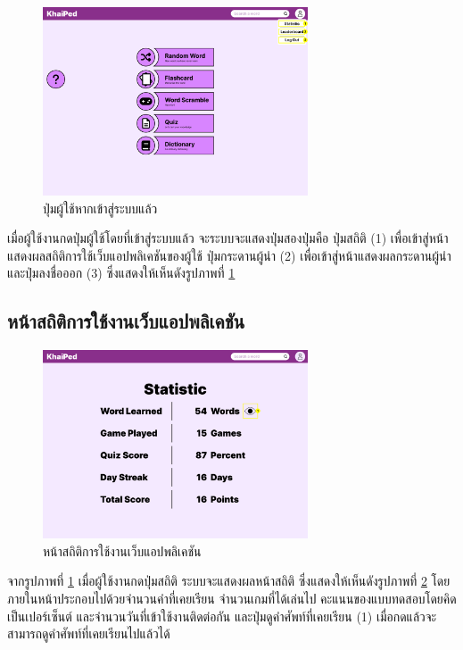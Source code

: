 \documentclass[12pt,oneside,openright,a4paper]{cpe-thai-project}
\begin{document}
\pagebreak
\begin{figure}[!h]\centering
	\includegraphics[width=0.7\textwidth, keepaspectratio=true]{image/chap3/ui/statistic/Home page - Logged In User Button.png}
	\caption{ปุ่มผู้ใช้หากเข้าสู่ระบบแล้ว}\label{fig:UI_UserButton}
\end{figure}
\hspace{1cm}
เมื่อผู้ใช้งานกดปุ่มผู้ใช้โดยที่เข้าสู่ระบบแล้ว จะระบบจะแสดงปุ่มสองปุ่มคือ ปุ่มสถิติ (1) เพื่อเข้าสู่หน้าแสดงผลสถิติการใช้เว็บแอปพลิเคชันของผู้ใช้
ปุ่มกระดานผู้นำ (2) เพื่อเข้าสู่หน้าแสดงผลกระดานผู้นำ และปุ่มลงชื่อออก (3)
ซึ่งแสดงให้เห็นดังรูปภาพที่ \ref{fig:UI_UserButton}

\pagebreak
\subsection{หน้าสถิติการใช้งานเว็บแอปพลิเคชัน}
\begin{figure}[!h]\centering
	\includegraphics[width=0.7\textwidth, keepaspectratio=true]{image/chap3/ui/statistic/Statistic.png}
	\caption{หน้าสถิติการใช้งานเว็บแอปพลิเคชัน}\label{fig:UI_Statistic}
\end{figure}
\hspace{1cm}
จากรูปภาพที่ \ref{fig:UI_UserButton} เมื่อผู้ใช้งานกดปุ่มสถิติ ระบบจะแสดงผลหน้าสถิติ ซึ่งแสดงให้เห็นดังรูปภาพที่ \ref{fig:UI_Statistic}
โดยภายในหน้าประกอบไปด้วยจำนวนคำที่เคยเรียน จำนวนเกมที่ได้เล่นไป คะแนนของแบบทดสอบโดยคิดเป็นเปอร์เซ็นต์ และจำนวนวันที่เข้าใช้งานติดต่อกัน
และปุ่มดูคำศัพท์ที่เคยเรียน (1) เมื่อกดแล้วจะสามารถดูคำศัพท์ที่เคยเรียนไปแล้วได้
\end{document}
